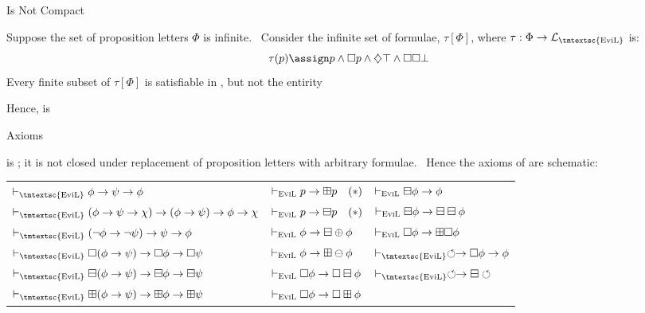  Is Not Compact

Suppose the set of proposition letters $\Phi$ is infinite. \ Consider the
infinite set of formulae, $\tau [\Phi]$, where $\tau : \Phi \rightarrow
\mathcal{L}_{\text{\tmtextsc{EviL}}}$ is:
\[ \tau (p) \assign p \wedge \Box  p \wedge \diamondsuit \top \wedge \Box \Box 
   \bot \]
Every finite subset of $\tau [\Phi]$ is satisfiable in , but
not the entirity

Hence,  is 



 Axioms

 is ; it is not closed under replacement
of proposition letters with arbitrary formulae. \ Hence the axioms of
 are schematic:

\begin{center}
  \begin{tabular}{lll}
    $\vdash_{\text{\tmtextsc{EviL}}} \phi \rightarrow \psi \rightarrow \phi$ &
    $\vdash_{\text{\textsc{EviL}}} p \rightarrow \boxplus p \hspace{1em}
    (\ast)$ & $\vdash_{\text{\textsc{EviL}}} \boxminus \phi \rightarrow
    \phi$\\
    $\vdash_{\text{\tmtextsc{EviL}}} (\phi \rightarrow \psi \rightarrow \chi)
    \rightarrow (\phi \rightarrow \psi) \rightarrow \phi \rightarrow \chi$ &
    $\vdash_{\text{\textsc{EviL}}} p \rightarrow \boxminus p \hspace{1em}
    (\ast)$ & $\vdash_{\text{\textsc{EviL}}} \boxminus \phi \rightarrow
    \boxminus \boxminus \phi$\\
    $\vdash_{\text{\tmtextsc{EviL}}} (\neg \phi \rightarrow \neg \psi)
    \rightarrow \psi \rightarrow \phi$ & $\vdash_{\text{\textsc{EviL}}} \phi
    \rightarrow \boxminus \oplus \phi$ & $\vdash_{\text{\textsc{EviL}}} \Box 
    \phi \rightarrow \boxplus \Box  \phi$\\
    $\vdash_{\text{\tmtextsc{EviL}}} \Box (\phi \rightarrow \psi) \rightarrow
    \Box  \phi \rightarrow \Box  \psi$ & $\vdash_{\text{\textsc{EviL}}} \phi
    \rightarrow \boxplus \ominus \phi$ & $\vdash_{\text{\tmtextsc{EviL}}}
    \circlearrowleft \rightarrow \Box  \phi \rightarrow \phi$\\
    $\vdash_{\text{\tmtextsc{EviL}}} \boxminus (\phi \rightarrow \psi)
    \rightarrow \boxminus \phi \rightarrow \boxminus \psi$ &
    $\vdash_{\text{\textsc{EviL}}} \Box  \phi \rightarrow \Box  \boxminus
    \phi$ & $\vdash_{\text{\tmtextsc{EviL}}} \circlearrowleft \rightarrow
    \boxminus \circlearrowleft$\\
    $\vdash_{\text{\tmtextsc{EviL}}} \boxplus (\phi \rightarrow \psi)
    \rightarrow \boxplus \phi \rightarrow \boxplus \psi$ &
    $\vdash_{\text{\textsc{EviL}}} \Box  \phi \rightarrow \Box  \boxplus \phi$
    & 
  \end{tabular}
\end{center}

